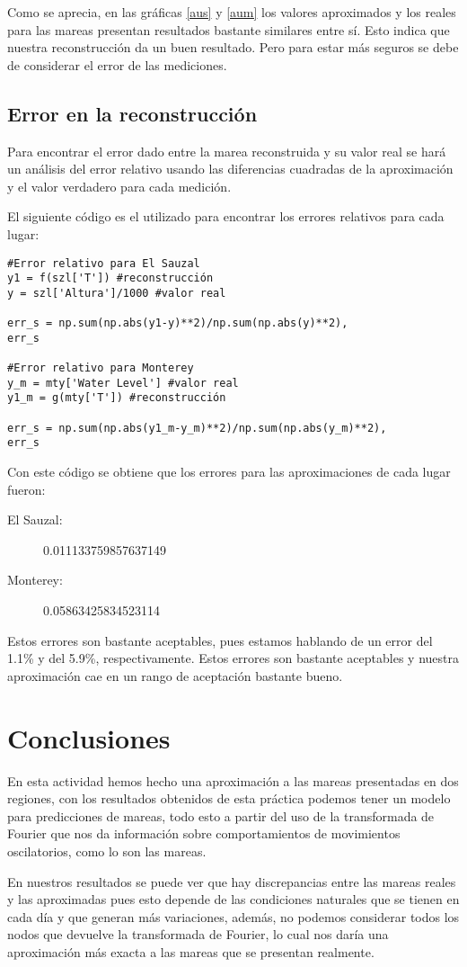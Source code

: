 Como se aprecia, en las gráficas \ref{aus} y \ref{aum} los valores aproximados y los reales para las mareas presentan resultados bastante similares entre sí. Esto indica que nuestra reconstrucción da un buen resultado. Pero para estar más seguros se debe de considerar el error de las mediciones.

\subsection{Error en la reconstrucción}
Para encontrar el error dado entre la marea reconstruida y su valor real se hará un análisis del error relativo usando las diferencias cuadradas de la aproximación y el valor verdadero para cada medición.

El siguiente código es el utilizado para encontrar los errores relativos para cada lugar:
\begin{verbatim}
#Error relativo para El Sauzal
y1 = f(szl['T']) #reconstrucción
y = szl['Altura']/1000 #valor real

err_s = np.sum(np.abs(y1-y)**2)/np.sum(np.abs(y)**2),
err_s

#Error relativo para Monterey
y_m = mty['Water Level'] #valor real
y1_m = g(mty['T']) #reconstrucción

err_s = np.sum(np.abs(y1_m-y_m)**2)/np.sum(np.abs(y_m)**2),
err_s
\end{verbatim}
Con este código se obtiene que los errores para las aproximaciones de cada lugar fueron:
\begin{description}
\item [El Sauzal:] 0.011133759857637149
\item [Monterey:] 0.05863425834523114
\end{description}

Estos errores son bastante aceptables, pues estamos hablando de un error del 1.1\% y del 5.9\%, respectivamente. Estos errores son bastante aceptables y nuestra aproximación cae en un rango de aceptación bastante bueno.

\section{Conclusiones}
En esta actividad hemos hecho una aproximación a las mareas presentadas en dos regiones, con los resultados obtenidos de esta práctica podemos tener un modelo para predicciones de mareas, todo esto a partir del uso de la transformada de Fourier que nos da información sobre comportamientos de movimientos oscilatorios, como lo son las mareas.

En nuestros resultados se puede ver que hay discrepancias entre las mareas reales y las aproximadas pues esto depende de las condiciones naturales que se tienen en cada día y que generan más variaciones, además, no podemos considerar todos los nodos que devuelve la transformada de Fourier, lo cual nos daría una aproximación más exacta a las mareas que se presentan realmente.

\newpage
\nocite{mareas}
\nocite{noaa}
\nocite{cicese}



